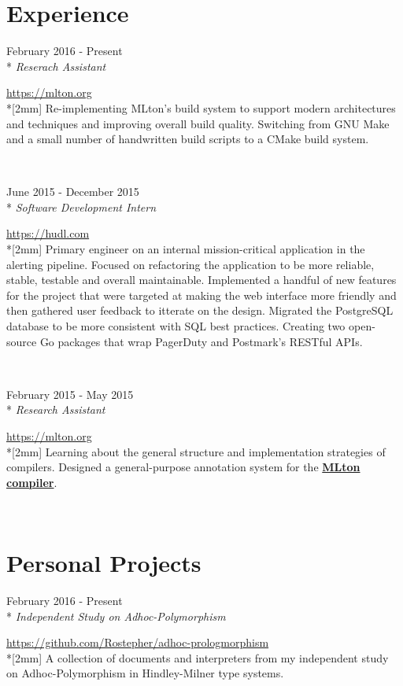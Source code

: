 \documentclass[a4paper,margin,line]{resume}
\newcommand{\rvspace}{2mm} %
\newcommand{\rurl}[1]{\hfill {\footnotesize \url{#1}}}
\newcommand{\rdate}[1]{\hfill {\small #1}}
\newcommand{\rdescription}[1]{\small #1 \normalsize}
\newcommand{\ritem}[5] {
    \item[#1]                               %
    \hfill \rdate{#2} \\*                   %
    \hfill {\small \emph{#3}}               %
    \strut \hfill \rurl{#4} \\*[\rvspace]   %
    \rdescription{#5}                       %
}
\newcommand{\remployer}{\ritem}
\newcommand{\rproject}{\ritem}
\begin{document}
\begin{resume}
\section{\mysidestyle Experience}
\begin{asparadesc}
    \remployer {Rochester Institute of Technology}
               {February 2016 - Present}
               {Reserach Assistant}
               {https://mlton.org}
    {
        Re-implementing MLton's build system to support modern architectures and
        techniques and improving overall build quality. Switching from GNU Make
        and a small number of handwritten build scripts to a CMake build system.
    }
    \\

    \remployer {Hudl}
               {June 2015 - December 2015}
               {Software Development Intern}
               {https://hudl.com}
    {
        Primary engineer on an internal mission-critical application in the
        alerting pipeline. Focused on refactoring the application to be more
        reliable, stable, testable and overall maintainable. Implemented a
        handful of new features for the project that were targeted at making
        the web interface more friendly and then gathered user feedback to
        itterate on the design. Migrated the PostgreSQL database to be more
        consistent with SQL best practices. Creating two open-source Go packages
        that wrap PagerDuty and Postmark's RESTful APIs.
    }
    \\

    \remployer {Rochester Institute of Technology}
               {February 2015 - May 2015}
               {Research Assistant}
               {https://mlton.org}
    {
        Learning about the general structure and implementation strategies
        of compilers. Designed a general-purpose annotation system for the
        \href{https://mlton.org}{\bf MLton compiler}.
    }
    \\
\end{asparadesc}

\section{\mysidestyle Personal Projects}
\begin{asparadesc}
    \rproject {adhoc-prologmorphism}
              {February 2016 - Present}
              {Independent Study on Adhoc-Polymorphism}
              {https://github.com/Rostepher/adhoc-prologmorphism}
    {
        A collection of documents and interpreters from my independent study on
        Adhoc-Polymorphism in Hindley-Milner type systems.
    }
    \\


\end{asparadesc}
\end{resume}
\end{document}
